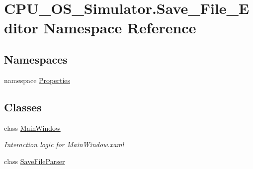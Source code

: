\hypertarget{namespace_c_p_u___o_s___simulator_1_1_save___file___editor}{}\section{C\+P\+U\+\_\+\+O\+S\+\_\+\+Simulator.\+Save\+\_\+\+File\+\_\+\+Editor Namespace Reference}
\label{namespace_c_p_u___o_s___simulator_1_1_save___file___editor}
\subsection*{Namespaces}
\begin{DoxyCompactItemize}
\item 
namespace \hyperlink{namespace_c_p_u___o_s___simulator_1_1_save___file___editor_1_1_properties}{Properties}
\end{DoxyCompactItemize}
\subsection*{Classes}
\begin{DoxyCompactItemize}
\item 
class \hyperlink{class_c_p_u___o_s___simulator_1_1_save___file___editor_1_1_main_window}{Main\+Window}
\begin{DoxyCompactList}\small\item\em Interaction logic for Main\+Window.\+xaml \end{DoxyCompactList}\item 
class \hyperlink{class_c_p_u___o_s___simulator_1_1_save___file___editor_1_1_save_file_parser}{Save\+File\+Parser}
\end{DoxyCompactItemize}
